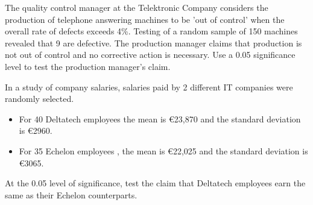 \documentclass[a4paper,12pt]{article}
\begin{document}
The quality control manager at the Telektronic Company considers the production of telephone answering machines to be ’out of control’ when the overall rate of defects exceeds 4\%. 
 	Testing of a random sample of 150 machines revealed that 9 are defective. The production manager claims that production is not out of control and no corrective action is necessary. Use a 0.05 significance level to test the production manager’s claim.
 	
 	\item In a study of company salaries, salaries paid by 2 different IT companies were randomly selected.
 	
 	\begin{itemize}
 		\item For 40 Deltatech employees the mean is €23,870 and the standard deviation is €2960. 
 		\item For 35 Echelon employees , the mean is €22,025 and the standard deviation is €3065. 
 	\end{itemize}
 	
 	At the 0.05 level of significance, test the claim that Deltatech employees earn the same as their  Echelon counterparts.
\end{document}
